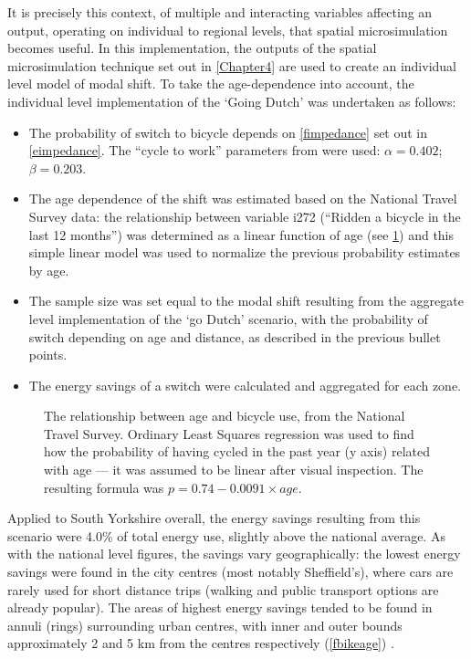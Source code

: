 It is precisely this context, of multiple and interacting variables
affecting an output, operating on individual to regional levels,
that spatial microsimulation becomes useful. In this implementation,
the outputs of the spatial microsimulation technique set out
in \cref{Chapter4} are used to create an individual level model of modal shift.
To take the age-dependence into account, the individual level implementation
of the `Going Dutch' was undertaken as follows:
\begin{itemize}
\item The probability of switch to bicycle depends on \cref{fimpedance}
set out in \cref{eimpedance}.
The ``cycle to work'' parameters from
\citet{Iacono2010} were used: $\alpha = 0.402$; $\beta = 0.203$.
\item The age dependence of the shift was estimated based on the National
Travel Survey data: the 
relationship between variable i272 (``Ridden a bicycle in the last 12 months'')
was determined as a linear function of age (see \cref{fpriden}) and this
simple linear model was used to normalize the previous probability
estimates by age.
\item The sample size was set equal to the modal shift resulting from the
aggregate level implementation of the `go Dutch' scenario, with the probability
of switch depending on age and distance, as described in the previous bullet points.
\item The energy savings of a switch were calculated and aggregated for each zone.
\end{itemize}

\begin{figure}
 \caption[The relationship between age and bicycle use]
 {The relationship between age and bicycle use, from the National Travel Survey.
 Ordinary Least Squares regression was used to find how the probability
 of having cycled in the past year (y axis) related with age --- it was assumed
 to be linear after visual inspection. The resulting formula was $p = 0.74 -
 0.0091 \times age$. 
 } \label{fpriden}
\end{figure}

Applied to South Yorkshire overall, the energy savings resulting from this
scenario were 4.0\% of total energy use, slightly above the national average.
As with the national level figures, the savings vary geographically: the lowest
energy savings were found in the city centres (most notably Sheffield's),
where cars are rarely used for short distance trips (walking and public
transport options are already popular). The areas of highest energy savings
tended to be found in annuli (rings) surrounding urban centres, with inner and
outer bounds approximately 2 and 5 km from the centres respectively (\cref{fbikeage}) .

